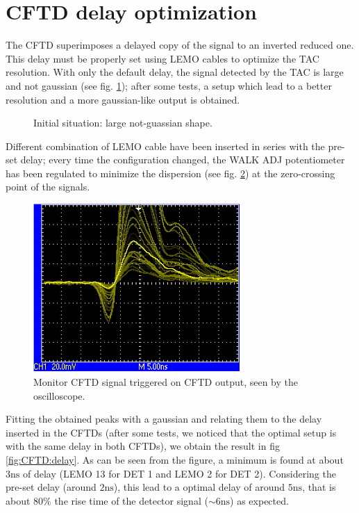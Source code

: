 \documentclass[11pt,a4 paper]{article}
\begin{document}
\section{CFTD delay optimization}

The CFTD superimposes a delayed copy of the signal to an inverted reduced one. This delay must be properly set using LEMO cables to optimize the TAC resolution. With only the default delay, the signal detected by the TAC is large and not gaussian (see fig. \ref{fig:delay:bad}); after some tests, a setup which lead to a better resolution and a more gaussian-like output is obtained.

\begin{figure}
    \centering
    \caption{Initial situation: large not-guassian shape.}
    \label{fig:delay:bad}
\end{figure}

Different combination of LEMO cable have been inserted in series with the pre-set delay; every time the configuration changed, the WALK ADJ potentiometer has been regulated to minimize the dispersion (see fig. \ref{fig:oscilloscope}) at the zero-crossing point of the signals.

\begin{figure}
    \centering
    \includegraphics[width=0.7\textwidth]{img/oscilloscope.jpg}
    \caption{Monitor CFTD signal triggered on CFTD output, seen by the oscilloscope.}
    \label{fig:oscilloscope}
\end{figure}

Fitting the obtained peaks with a gaussian and relating them to the delay inserted in the CFTDs (after some tests, we noticed that the optimal setup is with the same delay in both CFTDs), we obtain the result in fig \ref{fig:CFTD:delay}. As can be seen from the figure, a minimum is found at about $3\si{\nano\second}$ of delay (LEMO 13 for DET 1 and LEMO 2 for DET 2). Considering the pre-set delay (around $2\si{\nano\second}$), this lead to a optimal delay of around $5\si{\nano\second}$, that is about $80\%$ the rise time of the detector signal ($\sim6\si{\nano\second}$) as expected.
\end{document}
